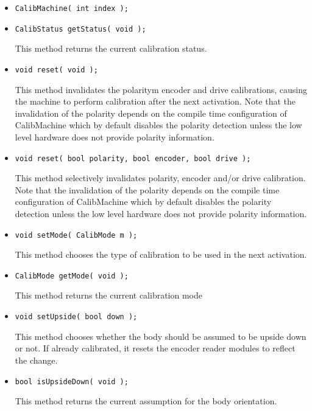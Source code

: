 \constructors

\begin{itemize}
\item{\tt CalibMachine( int index ); }
\end{itemize}

\localinterface

\begin{itemize}
\item{\tt CalibStatus getStatus( void ); } \par
This method returns the current calibration status.

\item{\tt void reset( void );} \par
This method invalidates the polaritym encoder and drive calibrations,
causing the machine to perform calibration after the next activation. Note
that the invalidation of the polarity depends on the compile time
configuration of CalibMachine which by default disables the polarity
detection unless the low level hardware does not provide polarity information.

\item{\tt void reset( bool polarity, bool encoder, bool drive );} \par
This method selectively invalidates polarity, encoder and/or drive
calibration. Note that the invalidation of the polarity depends on the
compile time configuration of CalibMachine which by default disables the
polarity detection unless the low level hardware does not provide polarity
information.

\item{\tt void setMode( CalibMode m ); } \par
This method chooses the type of calibration to be used in the next
activation.

\item{\tt CalibMode getMode( void ); } \par
This method returns the current calibration mode

\item{\tt void setUpside( bool down ); } \par
This method chooses whether the body should be assumed to be upside down or
not.  If already calibrated, it resets the encoder reader modules to reflect
the change.

\item{\tt bool isUpsideDown( void ); } \par
This method returns the current assumption for the body orientation.

\end{itemize}

